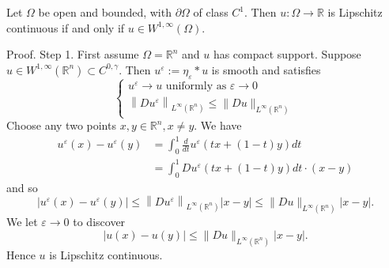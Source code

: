 \begin{theorem}
    Let $\Omega$ be open and bounded, with $\partial \Omega$ of class $C^1$. Then $u: \Omega \rightarrow \mathbb{R}$ is Lipschitz continuous if and only if $u \in W^{1, \infty}\left(\Omega\right)$.

    Proof.
    Step 1. First assume $\Omega=\mathbb{R}^n$ and $u$ has compact support.
    Suppose $u \in W^{1, \infty}\left(\mathbb{R}^n\right) \subset C^{0,\gamma}$.
    Then $u^{\varepsilon}:=\eta_{\varepsilon} * u$ is smooth and satisfies
    \begin{equation*}
        \left\{\begin{array}{l}
            u^{\varepsilon} \rightarrow u \text { uniformly as } \varepsilon \rightarrow 0 \\
            \left\|D u^{\varepsilon}\right\|_{L^{\infty}\left(\mathbb{R}^n\right)} \leq\|D u\|_{L^{\infty}\left(\mathbb{R}^n\right)}
        \end{array}\right.
    \end{equation*}
    Choose any two points $x, y \in \mathbb{R}^n, x \neq y$. We have
    \begin{equation*}
        \begin{aligned}
            u^{\varepsilon}(x)-u^{\varepsilon}(y) & =\int_0^1 \frac{d}{d t} u^{\varepsilon}(t x+(1-t) y) d t \\
                                                  & =\int_0^1 D u^{\varepsilon}(t x+(1-t) y) d t \cdot(x-y)
        \end{aligned}
    \end{equation*}
    and so
    \begin{equation*}
        \left|u^{\varepsilon}(x)-u^{\varepsilon}(y)\right| \leq\left\|D u^{\varepsilon}\right\|_{L^{\infty}\left(\mathbb{R}^n\right)}|x-y| \leq\|D u\|_{L^{\infty}\left(\mathbb{R}^n\right)}|x-y| .
    \end{equation*}
    We let $\varepsilon \rightarrow 0$ to discover
    \begin{equation*}
        |u(x)-u(y)| \leq\|D u\|_{L^{\infty}\left(\mathbb{R}^n\right)}|x-y| .
    \end{equation*}
    Hence $u$ is Lipschitz continuous.


\end{theorem}
